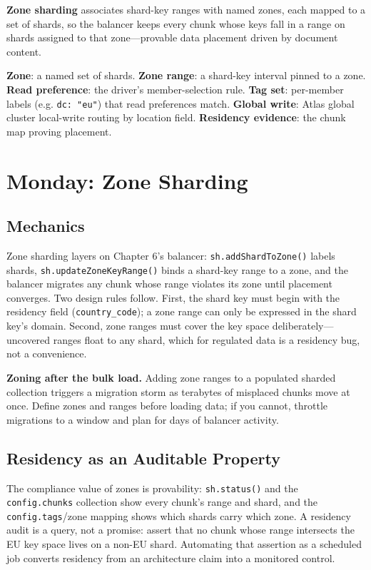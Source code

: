 \begin{definitionbox}
\textbf{Zone sharding} associates shard-key ranges with named zones, each mapped to a set of shards, so the balancer keeps every chunk whose keys fall in a range on shards assigned to that zone---provable data placement driven by document content.
\end{definitionbox}

\begin{keyterms}
\textbf{Zone}: a named set of shards. \textbf{Zone range}: a shard-key interval pinned to a zone. \textbf{Read preference}: the driver's member-selection rule. \textbf{Tag set}: per-member labels (e.g. \texttt{dc: "eu"}) that read preferences match. \textbf{Global write}: Atlas global cluster local-write routing by location field. \textbf{Residency evidence}: the chunk map proving placement.
\end{keyterms}

\section{Monday: Zone Sharding}
\subsection{Mechanics}
Zone sharding layers on Chapter 6's balancer: \texttt{sh.addShardToZone()} labels shards, \texttt{sh.updateZoneKeyRange()} binds a shard-key range to a zone, and the balancer migrates any chunk whose range violates its zone until placement converges. Two design rules follow. First, the shard key must begin with the residency field (\texttt{country\_code}); a zone range can only be expressed in the shard key's domain. Second, zone ranges must cover the key space deliberately---uncovered ranges float to any shard, which for regulated data is a residency bug, not a convenience.

\begin{pitfall}
\textbf{Zoning after the bulk load.} Adding zone ranges to a populated sharded collection triggers a migration storm as terabytes of misplaced chunks move at once. Define zones and ranges before loading data; if you cannot, throttle migrations to a window and plan for days of balancer activity.
\end{pitfall}

\subsection{Residency as an Auditable Property}
The compliance value of zones is provability: \texttt{sh.status()} and the \texttt{config.chunks} collection show every chunk's range and shard, and the \texttt{config.tags}/zone mapping shows which shards carry which zone. A residency audit is a query, not a promise: assert that no chunk whose range intersects the EU key space lives on a non-EU shard. Automating that assertion as a scheduled job converts residency from an architecture claim into a monitored control.

